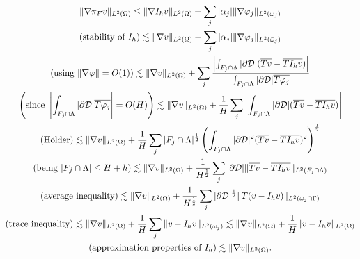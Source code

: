 \begin{multline*}
\|\nabla \pi_F v \|_{L^2(\Omega)} \leq \|\nabla I_h v\|_{L^2(\Omega)} + \sum_j|\alpha_j|\|\nabla \varphi _j\|_{L^2(\bar{\omega}_j)}\\
(\text{stability of }I_h)\lesssim   \|\nabla  v\|_{L^2(\Omega)} + \sum_j|\alpha_j|\|\nabla \varphi _j\|_{L^2(\bar{\omega}_j)}
\\
\left(\text{using }\|\nabla \varphi\|=O(1)\right) \lesssim \|\nabla  v\|_{L^2(\Omega)} + \sum_j \frac{\left|\int_{F_j\cap \Lambda} |\partial\mathcal{D}| (\overline{Tv}-\overline{TI_hv})\right|}{\int_{F_j\cap \Lambda}|\partial\mathcal{D}|\overline{T\varphi_j}}
\\
\left(\text{since }\left|\int_{F_j\cap \Lambda}|\partial\mathcal{D}|\overline{T\varphi_j}\right|=O(H)\right) \lesssim  \|\nabla  v\|_{L^2(\Omega)} + \frac 1H \sum_j \left|\int_{F_j\cap \Lambda} |\partial\mathcal{D}| (\overline{Tv}-\overline{TI_hv})\right| 
\\
(\text{H\"older}) \lesssim  \|\nabla  v\|_{L^2(\Omega)} + \frac 1H \sum_j |F_j\cap \Lambda|^{\frac 12} \left(\int_{F_j\cap \Lambda} |\partial\mathcal{D}|^2(\overline{Tv}-\overline{TI_hv})^2\right)^{\frac 12}
\\
(\text{being }|F_j\cap \Lambda| \leq H+h)\lesssim   \|\nabla  v\|_{L^2(\Omega)} + \frac {1}{H^{\frac 12}} \sum_j  |\partial\mathcal{D}|\| \overline{Tv}-\overline{TI_hv}\|_{L^2(F_j\cap \Lambda)}
\\
(\text{average inequality}) \lesssim \|\nabla  v\|_{L^2(\Omega)} + \frac {1}{H^{\frac 12}} \sum_j |\partial\mathcal{D}|^{\frac 12} \| T(v-I_hv)\|_{L^2(\omega _j\cap \Gamma)}  
\\
\left(\text{trace inequality} \right)\lesssim   \|\nabla  v\|_{L^2(\Omega)} + \frac {1}{H} \sum_j  \| v-I_h v\|_{L^2(\omega_j)} \lesssim \|\nabla  v\|_{L^2(\Omega)} + \frac {1}{H}  \| v-I_h v\|_{L^2(\Omega)} 
\\
(\text{approximation properties of }I_h)\lesssim \|\nabla  v\|_{L^2(\Omega)}.
\end{multline*}

